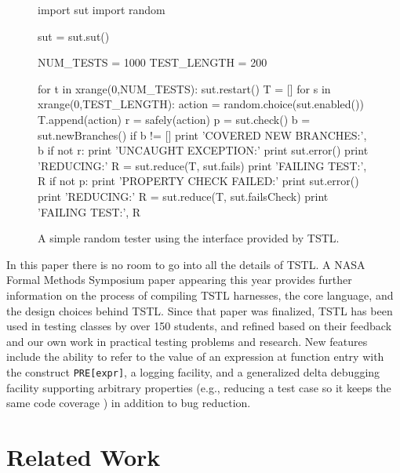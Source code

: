 \documentclass{sig-alternate}
\begin{document}
\begin{figure}
\begin{code}
import sut
import random

sut = sut.sut()

NUM\_TESTS = 1000
TEST\_LENGTH = 200 

for t in xrange(0,NUM\_TESTS):
     sut.restart()
     T = []
     for s in xrange(0,TEST\_LENGTH): 
         action = random.choice(sut.enabled())
         T.append(action)
         r = safely(action)
         p = sut.check()
         b = sut.newBranches()
         if b != []
            print 'COVERED NEW BRANCHES:', b
         if not r:
            print 'UNCAUGHT EXCEPTION:' 
            print sut.error() 
            print 'REDUCING:'
            R = sut.reduce(T, sut.fails) 
            print 'FAILING TEST:', R
         if not p:
            print 'PROPERTY CHECK FAILED:' 
            print sut.error()
            print 'REDUCING:'
            R = sut.reduce(T, sut.failsCheck) 
            print 'FAILING TEST:', R
\end{code}
\caption{A simple random tester using the interface provided by TSTL.}
\label{fig:rt}
\end{figure}

In this paper there is no room to go into all the details of TSTL.  A
NASA Formal Methods Symposium paper \cite{NFM15} appearing this year
provides further information on the process of compiling TSTL
harnesses, the core language, and the design choices behind TSTL.
Since that paper was finalized, TSTL has been used in testing classes
by over 150 students, and refined based on their feedback and our own
work in practical testing problems and research.  New features include
the ability to refer to the value of an expression at function entry
with the construct {\tt PRE[expr]}, a logging facility, and a
generalized delta debugging facility supporting arbitrary properties
(e.g., reducing a test case so it keeps the same code coverage
\cite{icst2014}) in addition to bug reduction.


\section{Related Work}
\end{document}
